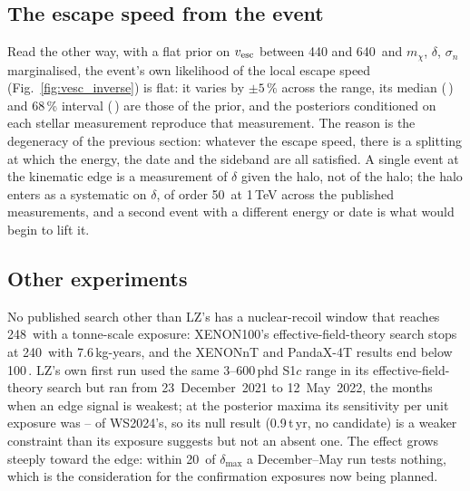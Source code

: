 \documentclass[11pt]{article}
\newcommand{\vesc}{v_{\rm esc}\xspace}
\newcommand{\keV}{\,\mathrm{keV}\xspace}
\newcommand{\kms}{\,\mathrm{km\,s^{-1}}\xspace}
\begin{document}
\subsection{The escape speed from the event}
Read the other way, with a flat prior on $\vesc$ between 440 and 640\kms and
$m_\chi$, $\delta$, $\sigma_n$ marginalised, the event's own likelihood of the local
escape speed (Fig.~\ref{fig:vesc_inverse}) is flat: it varies by $\pm5\,\%$ across the
range, its median (\VescMedian\kms) and 68\,\% interval (\VescSixtyEight\kms) are
those of the prior, and the posteriors conditioned on each stellar measurement
reproduce that measurement.  The reason is the degeneracy of the previous section:
whatever the escape speed, there is a splitting at which the energy, the date and the
sideband are all satisfied.  A single event at the kinematic edge is a measurement of
$\delta$ given the halo, not of the halo; the halo enters as a systematic on
$\delta$, of order 50\keV at 1\,TeV across the published measurements, and a
second event with a different energy or date is what would begin to lift it.

\subsection{Other experiments}
No published search other than LZ's has a nuclear-recoil window that reaches
248\keV with a tonne-scale exposure: XENON100's effective-field-theory search
stops at 240\keV with 7.6\,kg-years, and the XENONnT and PandaX-4T results end
below 100\keV.  LZ's own first run used the same 3--600\,phd S1$c$ range in its
effective-field-theory search \citep{LZ2024eftSR1} but ran from 23~December~2021 to
12~May~2022, the months when an edge signal is weakest; at the posterior maxima
its sensitivity per unit exposure was \WsTwentyTwoRelShmVescLow--\WsTwentyTwoRelShmVescHigh
of WS2024's, so its null result (0.9\,t\,yr, no candidate) is a weaker constraint
than its exposure suggests but not an absent one.  The effect grows steeply toward
the edge: within 20\keV of $\delta_{\max}$ a December--May run tests nothing, which
is the consideration for the confirmation exposures now being planned.
\end{document}
